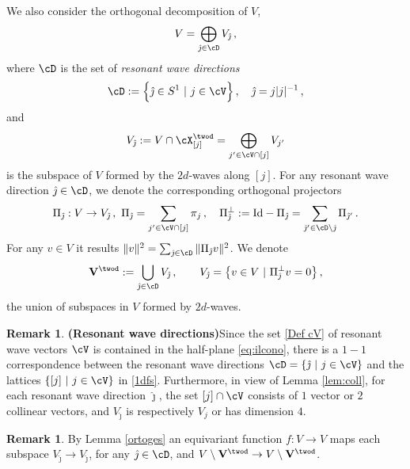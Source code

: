 \documentclass[11pt,a4paper,reqno]{article}
\numberwithin{equation}{section}
\theoremstyle{definition}
\newtheorem{remark}[theorem]{Remark}
\begin{document}
We also  consider the orthogonal decomposition of $ V $, 
\[
V = \bigoplus_{\hat\jmath \in \cD} V_{\hat\jmath} \, , 
\]
where $ \cD $ is the set of {\it resonant wave directions}
\begin{equation}\label{decokerj}
\cD:= \Big\{ \hat\jmath  \in S^1 \ | \  j \in \cV \Big\}   \, , \quad \hat\jmath = j  |j|^{-1} \, , 
\end{equation}
and 
    \begin{equation}\label{Def piJ}
            V_{\hat\jmath} := V \cap \cX_{[j]}^{\twod} =\bigoplus_{j'\in \cV \cap [j] 
            } V_{j'}  
    \end{equation} 
is 
the subspace  of $ V $  formed by the $ 2 d$-waves along $ [j] $.
For any resonant wave direction $ {\hat\jmath} \in \cD $, we denote the corresponding orthogonal projectors
\begin{equation}\label{Def P}
        \Pi_{\hat\jmath}:V\to V_{\hat\jmath} \, , \ \Pi_{\hat\jmath} = 
        \sum_{j' \in \cV \cap [j]} \pi_j \, , 
        \quad 
        \Pi_{\hat\jmath}^\bot:= \text{Id} -\Pi_{\hat\jmath}=\sum_{\hat\jmath' \in \cD\setminus \hat\jmath} \Pi_{\hat\jmath'} \,  .
    \end{equation}
For any $ v \in V $ it results 
$\| v \|^2 = \sum_{\hat\jmath \in \cD} \| \Pi_{\hat\jmath} v \|^2 $.   We denote 
\begin{equation}\label{V2d}
{\bf V}^{\twod} := \bigcup_{\hat\jmath \in \cD} V_{\hat\jmath}
\, , \qquad 
V_{\hat\jmath} = \big\{ v \in V \ | \ 
\Pi_{\hat\jmath}^\bot v = 0  \big\} \, , 
\end{equation}
the union of subspaces in $ V $  formed by $ 2 d$-waves. 
    \begin{remark}{\bf (Resonant wave  directions)}\label{rm:j hat}
        Since the set \eqref{Def cV} of resonant wave vectors $\cV$ is contained in the half-plane \eqref{eq:ilcono}, there is a $1-1$ correspondence between the resonant wave directions $\cD=\{\hat\jmath \  | \ j\in \cV\}$ and the lattices $\{[j] \ | \ j\in \cV\}$ in \eqref{1dfs}.
        Furthermore, in view of Lemma \ref{lem:coll}, for each resonant wave direction $\hat\jmath$,  the set $ [j]\cap \cV$ consists of 
$ 1 $ vector or $ 2 $ collinear vectors, and   
$ V_{\hat\jmath }$
is respectively   $ V_j $ 
or has 
dimension $ 4 $.  
    \end{remark}

 \begin{remark}\label{rem:Vinv}
By Lemma \ref{ortoges}
an equivariant function $ f : V \to V $ 
maps each subspace $ V_{\hat\jmath} \to V_{\hat\jmath}  $,  for any 
$ \hat\jmath \in \cD  $,  and $ V \setminus {\bf V}^{\twod}
\to V \setminus {\bf V}^{\twod} $. 
\end{remark}
\end{document}
